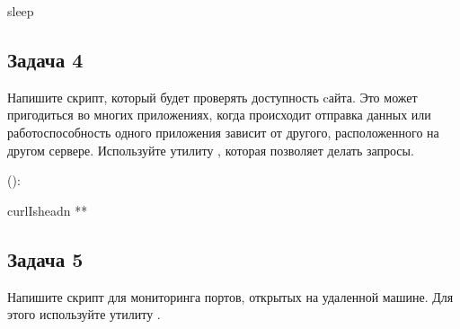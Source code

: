 \documentclass[letterpaper,10pt,russian]{sphinxmanual}
\begin{document}
\begin{sphinxVerbatim}[commandchars=\\\{\}]
\PYGZgt{}\PYGZgt{}

sleep
\end{sphinxVerbatim}


\subsection{Задача 4}
\label{\detokenize{educational_materials/bash/exercises:id5}}
\sphinxAtStartPar
Напишите скрипт, который будет проверять доступность cайта. Это может пригодиться во многих приложениях, когда происходит отправка данных или работоспособность одного приложения зависит от другого, расположенного на другом сервере. Используйте утилиту , которая позволяет делать запросы.

\sphinxAtStartPar
{}

\sphinxAtStartPar
():

\begin{sphinxVerbatim}[commandchars=\\\{\}]
curl\PYGZhy{}Ishead\PYGZhy{}n
\PYG{o}{[}\PYG{o}{[}**\PYG{o}{]}\PYG{o}{]}
\end{sphinxVerbatim}


\subsection{Задача 5}
\label{\detokenize{educational_materials/bash/exercises:id6}}
\sphinxAtStartPar
Напишите скрипт для мониторинга портов, открытых на удаленной машине. Для этого используйте утилиту .
\end{document}
